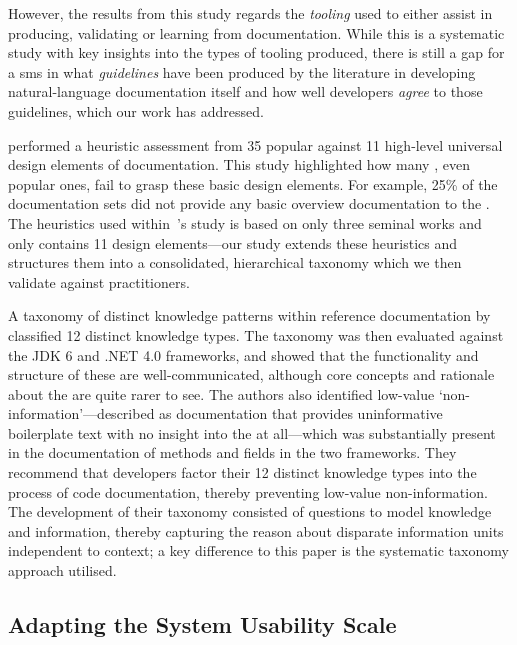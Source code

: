 However, the results from this study regards the \textit{tooling} used to either assist in producing, validating or learning from  documentation. While this is a systematic study with key insights into the types of tooling produced, there is still a gap for a \gls{sms} in what \textit{guidelines} have been produced by the literature in developing natural-language documentation itself and how well developers \textit{agree} to those guidelines, which our work has addressed.

\citet{Watson:2012uy} performed a heuristic assessment from 35 popular  against 11 high-level universal design elements of  documentation. This study highlighted how many , even popular ones, fail to grasp these basic design elements. For example, 25\% of the documentation sets did not provide any basic overview documentation to the . The heuristics used within~\citeauthor{Watson:2012uy}'s study is based on only three seminal works and only contains 11 design elements---our study extends these heuristics and structures them into a consolidated, hierarchical taxonomy which we then validate against practitioners.

A taxonomy of distinct knowledge patterns within reference documentation by~\citet{Maalej2013} classified 12 distinct knowledge types. The taxonomy was then evaluated against the JDK 6 and .NET 4.0 frameworks, and showed that the functionality and structure of these  are well-communicated, although core concepts and rationale about the  are quite rarer to see. The authors also identified low-value `non-information'---described as documentation that provides uninformative boilerplate text with no insight into the  at all---which was  substantially present in the documentation of methods and fields in the two frameworks. They recommend that developers factor their 12 distinct knowledge types into the process of code documentation, thereby preventing low-value non-information. The development of their taxonomy consisted of questions to model knowledge and information, thereby capturing the reason about disparate information units independent to context; a key difference to this paper is the systematic taxonomy approach utilised.


\subsection{Adapting the System Usability Scale}

